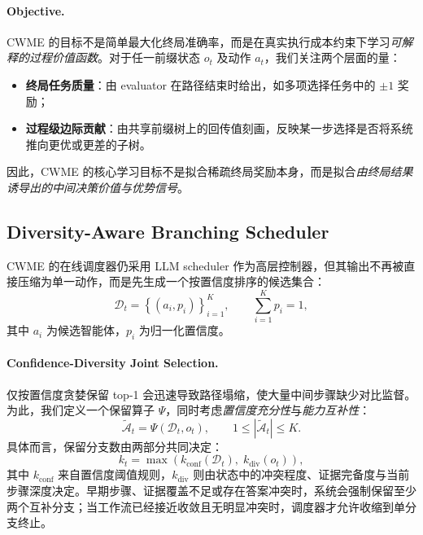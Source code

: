 \paragraph{Objective.}
CWME 的目标不是简单最大化终局准确率，而是在真实执行成本约束下学习\emph{可解释的过程价值函数}。对于任一前缀状态 $o_t$ 及动作 $a_t$，我们关注两个层面的量：
\begin{itemize}
    \item \textbf{终局任务质量}：由 evaluator 在路径结束时给出，如多项选择任务中的 $\pm 1$ 奖励；
    \item \textbf{过程级边际贡献}：由共享前缀树上的回传值刻画，反映某一步选择是否将系统推向更优或更差的子树。
\end{itemize}
因此，CWME 的核心学习目标不是拟合稀疏终局奖励本身，而是拟合\emph{由终局结果诱导出的中间决策价值与优势信号}。

\subsection{Diversity-Aware Branching Scheduler}

CWME 的在线调度器仍采用 LLM scheduler 作为高层控制器，但其输出不再被直接压缩为单一动作，而是先生成一个按置信度排序的候选集合：
\begin{equation}
    \mathcal{D}_t = \left\{(a_i, p_i)\right\}_{i=1}^{K}, \qquad \sum_{i=1}^{K} p_i = 1,
\end{equation}
其中 $a_i$ 为候选智能体，$p_i$ 为归一化置信度。

\paragraph{Confidence-Diversity Joint Selection.}
仅按置信度贪婪保留 top-1 会迅速导致路径塌缩，使大量中间步骤缺少对比监督。为此，我们定义一个保留算子 $\Psi$，同时考虑\emph{置信度充分性}与\emph{能力互补性}：
\begin{equation}
    \widetilde{\mathcal{A}}_t = \Psi(\mathcal{D}_t, o_t), \qquad 1 \le |\widetilde{\mathcal{A}}_t| \le K.
\end{equation}
具体而言，保留分支数由两部分共同决定：
\begin{equation}
    k_t = \max\left(k_{\text{conf}}(\mathcal{D}_t), \; k_{\text{div}}(o_t)\right),
\end{equation}
其中 $k_{\text{conf}}$ 来自置信度阈值规则，$k_{\text{div}}$ 则由状态中的冲突程度、证据完备度与当前步骤深度决定。早期步骤、证据覆盖不足或存在答案冲突时，系统会强制保留至少两个互补分支；当工作流已经接近收敛且无明显冲突时，调度器才允许收缩到单分支终止。


